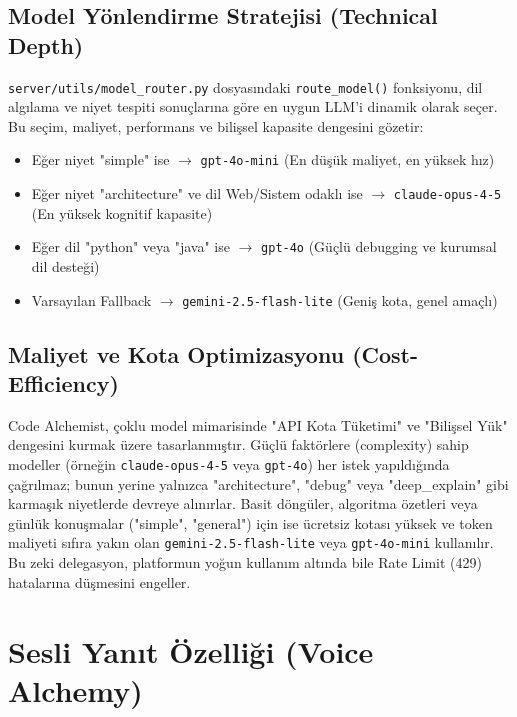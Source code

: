 \documentclass[12pt,a4paper]{article}
\begin{document}
\subsection{Model Yönlendirme Stratejisi (Technical Depth)}
\label{subsec:model-routing-tech}

\texttt{server/utils/model\_router.py} dosyasındaki \texttt{route\_model()} fonksiyonu, dil algılama ve niyet tespiti sonuçlarına göre en uygun LLM'i dinamik olarak seçer. Bu seçim, maliyet, performans ve bilişsel kapasite dengesini gözetir:

\begin{itemize}
    \item Eğer niyet "simple" ise $\rightarrow$ \texttt{gpt-4o-mini} (En düşük maliyet, en yüksek hız)
    \item Eğer niyet "architecture" ve dil Web/Sistem odaklı ise $\rightarrow$ \texttt{claude-opus-4-5} (En yüksek kognitif kapasite)
    \item Eğer dil "python" veya "java" ise $\rightarrow$ \texttt{gpt-4o} (Güçlü debugging ve kurumsal dil desteği)
    \item Varsayılan Fallback $\rightarrow$ \texttt{gemini-2.5-flash-lite} (Geniş kota, genel amaçlı)
\end{itemize}

\subsection{Maliyet ve Kota Optimizasyonu (Cost-Efficiency)}
\label{subsec:costopt}

Code Alchemist, çoklu model mimarisinde "API Kota Tüketimi" ve "Bilişsel Yük" dengesini kurmak üzere tasarlanmıştır. Güçlü faktörlere (complexity) sahip modeller (örneğin \texttt{claude-opus-4-5} veya \texttt{gpt-4o}) her istek yapıldığında çağrılmaz; bunun yerine yalnızca "architecture", "debug" veya "deep\_explain" gibi karmaşık niyetlerde devreye alınırlar. Basit döngüler, algoritma özetleri veya günlük konuşmalar ("simple", "general") için ise ücretsiz kotası yüksek ve token maliyeti sıfıra yakın olan \texttt{gemini-2.5-flash-lite} veya \texttt{gpt-4o-mini} kullanılır. Bu zeki delegasyon, platformun yoğun kullanım altında bile Rate Limit (429) hatalarına düşmesini engeller.

\section{Sesli Yanıt Özelliği (Voice Alchemy)}
\label{sec:voice}
\end{document}
